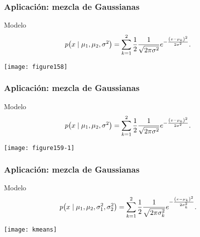 \documentclass[table]{beamer}
\begin{document}
\begin{frame}
    \frametitle{Aplicación: mezcla de Gaussianas}
    \begin{exampleblock}{Modelo}
        \begin{equation*}
            \pdf{x \mid \mu_{1} , \mu_{2} , \sigma^{2}} = \sum_{k = 1}^{2} \frac{1}{2} \frac{1}{\sqrt{2 \pi \sigma^{2}}} e^{- \frac{\parens{x - \mu_{k}}^{2}}{2 \sigma^{2}}} .
        \end{equation*}
    \end{exampleblock}
    \begin{center}
        \texttt{[image: figure158]}
    \end{center}
\end{frame}

\begin{frame}
    \frametitle{Aplicación: mezcla de Gaussianas}
    \begin{exampleblock}{Modelo}
        \begin{equation*}
            \pdf{x \mid \mu_{1} , \mu_{2} , \sigma^{2}} = \sum_{k = 1}^{2} \frac{1}{2} \frac{1}{\sqrt{2 \pi \sigma^{2}}} e^{- \frac{\parens{x - \mu_{k}}^{2}}{2 \sigma^{2}}} .
        \end{equation*}
    \end{exampleblock}
    \begin{center}
        \texttt{[image: figure159-1]}
    \end{center}
\end{frame}

\begin{frame}
    \frametitle{Aplicación: mezcla de Gaussianas}
    \begin{exampleblock}{Modelo}
        \begin{equation*}
            \pdf{x \mid \mu_{1} , \mu_{2} , \sigma^{2}_{1} , \sigma^{2}_{2}} = \sum_{k = 1}^{2} \frac{1}{2} \frac{1}{\sqrt{2 \pi \sigma^{2}_{k}}} e^{- \frac{\parens{x - \mu_{k}}^{2}}{2 \sigma^{2}_{k}}} .
        \end{equation*}
    \end{exampleblock}
    \begin{center}
        \texttt{[image: kmeans]}
    \end{center}
\end{frame}

\iffalse
\begin{frame}[allowframebreaks, noframenumbering]
\frametitle<presentation>{References}
\printbibliography
%
\end{frame}
\fi
\end{document}
